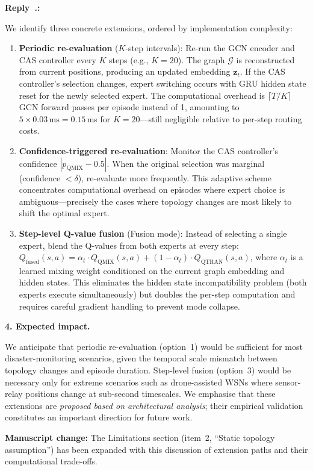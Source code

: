 \documentclass[11pt]{article}
\newcounter{reviewer}
\newcounter{replyctr}[reviewer]
\renewcommand{\thereplyctr}{\thereviewer.\arabic{replyctr}}
\newenvironment{reply}
  {\refstepcounter{replyctr}%
   \addtocounter{replyctr}{-1}%
   \medskip\noindent
   \begin{sf}\textbf{Reply~\thereplyctr:}\ }
  {\addtocounter{replyctr}{1}%
   \medskip\end{sf}}
\begin{document}
\begin{reply}
\begin{mdframed}[style=Resp]
We identify three concrete extensions, ordered by implementation complexity:

\begin{enumerate}[nosep]
    \item \textbf{Periodic re-evaluation} ($K$-step intervals): Re-run the GCN encoder and CAS controller every $K$ steps (e.g., $K = 20$). The graph $\mathcal{G}$ is reconstructed from current positions, producing an updated embedding $\mathbf{z}_{t}$. If the CAS controller's selection changes, expert switching occurs with GRU hidden state reset for the newly selected expert. The computational overhead is $\lceil T/K \rceil$ GCN forward passes per episode instead of 1, amounting to $5 \times 0.03\,\text{ms} = 0.15$\,ms for $K=20$---still negligible relative to per-step routing costs.
    
    \item \textbf{Confidence-triggered re-evaluation}: Monitor the CAS controller's confidence $|p_{\text{QMIX}} - 0.5|$. When the original selection was marginal (confidence $< \delta$), re-evaluate more frequently. This adaptive scheme concentrates computational overhead on episodes where expert choice is ambiguous---precisely the cases where topology changes are most likely to shift the optimal expert.
    
    \item \textbf{Step-level Q-value fusion} (Fusion mode): Instead of selecting a single expert, blend the Q-values from both experts at every step: $Q_{\text{fused}}(s, a) = \alpha_t \cdot Q_{\text{QMIX}}(s, a) + (1 - \alpha_t) \cdot Q_{\text{QTRAN}}(s, a)$, where $\alpha_t$ is a learned mixing weight conditioned on the current graph embedding and hidden states. This eliminates the hidden state incompatibility problem (both experts execute simultaneously) but doubles the per-step computation and requires careful gradient handling to prevent mode collapse.
\end{enumerate}

\medskip
\noindent\textbf{4. Expected impact.}

We anticipate that periodic re-evaluation (option~1) would be sufficient for most disaster-monitoring scenarios, given the temporal scale mismatch between topology changes and episode duration. Step-level fusion (option~3) would be necessary only for extreme scenarios such as drone-assisted WSNs where sensor-relay positions change at sub-second timescales. We emphasise that these extensions are \emph{proposed based on architectural analysis}; their empirical validation constitutes an important direction for future work.

\medskip
\noindent\textbf{Manuscript change:} The Limitations section (item~2, ``Static topology assumption'') has been expanded with this discussion of extension paths and their computational trade-offs.

\end{mdframed}
\end{reply}
\end{document}
